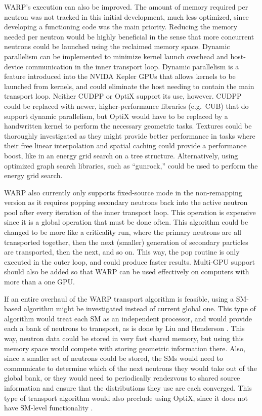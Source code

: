 \documentclass[preprint,12pt]{elsarticle}
\begin{document}
WARP's execution can also be improved.  The amount of memory required per neutron was not tracked in this initial development, much less optimized, since developing a functioning code was the main priority.  Reducing the memory needed per neutron would be highly beneficial in the sense that more concurrent neutrons could be launched using the reclaimed memory space.  Dynamic parallelism can be implemented to minimize kernel launch overhead and host-device communication in the inner transport loop.  Dynamic parallelism is a feature introduced into the NVIDA Kepler GPUs that allows kernels to be launched from kernels, and could eliminate the host needing to contain the main transport loop.  Neither CUDPP or OptiX support its use, however.  CUDPP could be replaced with newer, higher-performance libraries (e.g.\ CUB) that do support dynamic parallelism, but OptiX would have to be replaced by a handwritten kernel to perform the necessary geometric tasks.  Textures could be thoroughly investigated as they might provide better performance in tasks where their free linear interpolation and spatial caching could provide a performance boost, like in an energy grid search on a tree structure.   Alternatively, using optimized graph search libraries, such as ``gunrock,'' could be used to perform the energy grid search.

WARP also currently only supports fixed-source mode in the non-remapping version as it requires popping secondary neutrons back into the active neutron pool after every iteration of the inner transport loop.  This operation is expensive since it is a global operation that must be done often.  This algorithm could be changed to be more like a criticality run, where the primary neutrons are all transported together, then the next (smaller) generation of secondary particles are transported, then the next, and so on.  This way, the pop routine is only executed in the outer loop, and could produce faster results.  Multi-GPU support should also be added so that WARP can be used effectively on computers with more than a one GPU.

If an entire overhaul of the WARP transport algorithm is feasible, using a SM-based algorithm might be investigated instead of current global one.  This type of algorithm would treat each SM as an independent processor, and would provide each a bank of neutrons to transport, as is done by Liu and Henderson \cite{tianyu,henderson}.   This way, neutron data could be stored in very fast shared memory, but using this memory space would compete with storing geometric information there.  Also, since a smaller set of neutrons could be stored, the SMs would need to communicate to determine which of the next neutrons they would take out of the global bank, or they would need to periodically rendezvous to shared source information and ensure that the distributions they use are each converged.  This type of transport algorithm would also preclude using OptiX, since it does not have SM-level functionality \cite{optix}.
\end{document}
